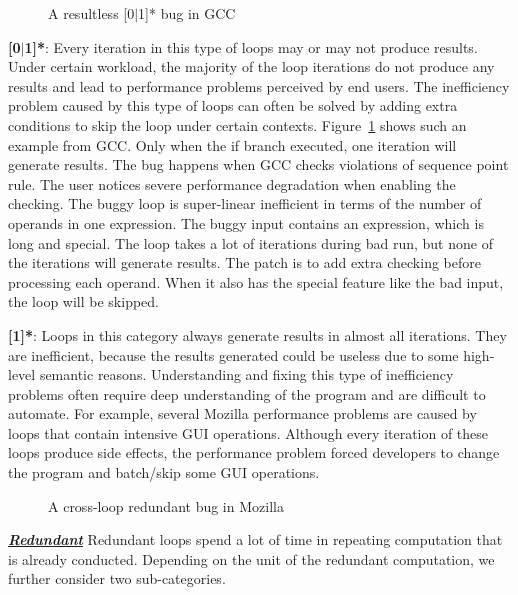 \begin{figure}
\caption{A resultless [0$|$1]* bug in GCC}
\label{fig:GCC46401}
\end{figure}

{\textbf{[0$|$1]*}}:
Every iteration in this type of loops may or may not produce results.
Under certain workload, the majority of the loop iterations do not produce
any results and lead to performance problems perceived by end users.
The inefficiency problem caused by this type of loops can often be solved
by adding extra conditions to skip the loop under certain contexts.
Figure~\ref{fig:GCC46401} shows such an example from GCC.
Only when the if branch executed,
one iteration will generate results. 
The bug happens when GCC checks violations of sequence point rule. 
The user notices severe performance degradation when enabling the checking. 
The buggy loop is super-linear inefficient in terms of the number of operands
in one expression. The buggy input contains an expression, which is long and special. 
The loop takes a lot of iterations during bad run, but none of the iterations will 
generate results. 
The patch is to add extra checking before processing each operand. When it also has
the special feature like the bad input, the loop will be skipped. 

{\textbf{[1]*}}:
Loops in this category always generate results in almost all iterations. 
They are inefficient, because the results generated could be useless due to
some high-level semantic reasons.
Understanding and fixing this type of inefficiency problems often require
deep understanding of the program and are difficult to automate.
For example, several Mozilla performance problems are caused by 
loops that contain intensive GUI operations.
Although every iteration of these loops produce side effects, 
the performance problem forced developers to change the program 
and batch/skip some GUI operations.


\begin{figure}
\caption{A cross-loop redundant bug in Mozilla}
\label{fig:Mozilla477564}
\end{figure}


\underline{\textit{\textbf{Redundant}}}
Redundant loops spend a lot of time in repeating computation that is already
conducted.
Depending on the unit of the redundant computation, we further consider 
two sub-categories.

